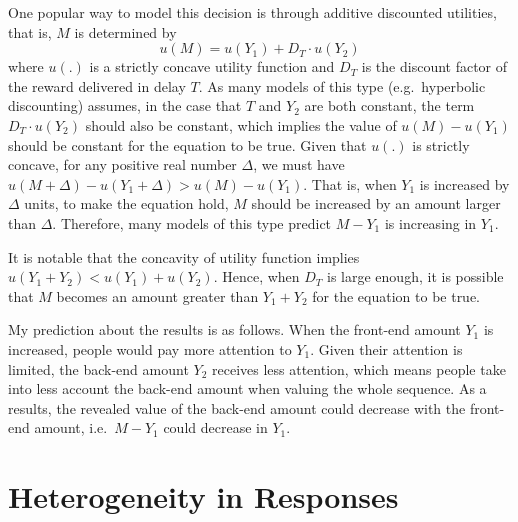 \documentclass[
  12pt,
]{article}
\begin{document}
One popular way to model this decision is through additive discounted
utilities, that is, \(M\) is determined by\[
u(M) = u(Y_1) + D_T \cdot u(Y_2)
\]where \(u(.)\) is a strictly concave utility function and \(D_T\) is
the discount factor of the reward delivered in delay \(T\). As many
models of this type (e.g.~hyperbolic discounting) assumes, in the case
that \(T\) and \(Y_2\) are both constant, the term \(D_T\cdot u(Y_2)\)
should also be constant, which implies the value of \(u(M) - u(Y_1)\)
should be constant for the equation to be true. Given that \(u(.)\) is
strictly concave, for any positive real number \(\Delta\), we must have
\(u(M+\Delta) - u(Y_1 + \Delta) > u(M) - u(Y_1)\). That is, when \(Y_1\)
is increased by \(\Delta\) units, to make the equation hold, \(M\)
should be increased by an amount larger than \(\Delta\). Therefore, many
models of this type predict \(M - Y_1\) is increasing in \(Y_1\).

It is notable that the concavity of utility function implies
\(u(Y_1 + Y_2) < u(Y_1) + u(Y_2)\). Hence, when \(D_T\) is large enough,
it is possible that \(M\) becomes an amount greater than \(Y_1 + Y_2\)
for the equation to be true.

My prediction about the results is as follows. When the front-end amount
\(Y_1\) is increased, people would pay more attention to \(Y_1\). Given
their attention is limited, the back-end amount \(Y_2\) receives less
attention, which means people take into less account the back-end amount
when valuing the whole sequence. As a results, the revealed value of the
back-end amount could decrease with the front-end amount, i.e.~\(M-Y_1\)
could decrease in \(Y_1\).

\hypertarget{heterogeneity-in-responses}{%
\section{Heterogeneity in Responses}\label{heterogeneity-in-responses}}
\end{document}
